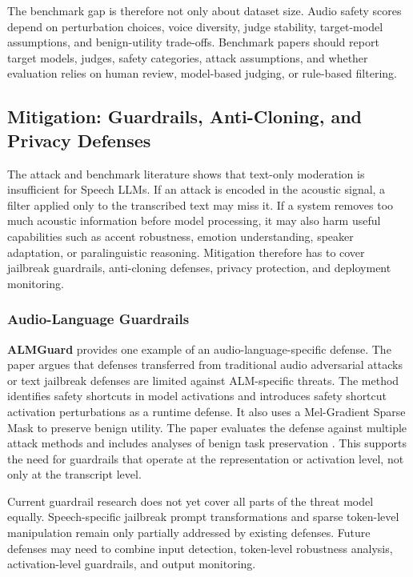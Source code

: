 The benchmark gap is therefore not only about dataset size. Audio safety scores depend on perturbation choices, voice diversity, judge stability, target-model assumptions, and benign-utility trade-offs. Benchmark papers should report target models, judges, safety categories, attack assumptions, and whether evaluation relies on human review, model-based judging, or rule-based filtering.

\subsection{Mitigation: Guardrails, Anti-Cloning, and Privacy Defenses}

The attack and benchmark literature shows that text-only moderation is insufficient for Speech LLMs. If an attack is encoded in the acoustic signal, a filter applied only to the transcribed text may miss it. If a system removes too much acoustic information before model processing, it may also harm useful capabilities such as accent robustness, emotion understanding, speaker adaptation, or paralinguistic reasoning. Mitigation therefore has to cover jailbreak guardrails, anti-cloning defenses, privacy protection, and deployment monitoring.

\subsubsection{Audio-Language Guardrails}

\textbf{ALMGuard} provides one example of an audio-language-specific defense. The paper argues that defenses transferred from traditional audio adversarial attacks or text jailbreak defenses are limited against ALM-specific threats. The method identifies safety shortcuts in model activations and introduces safety shortcut activation perturbations as a runtime defense. It also uses a Mel-Gradient Sparse Mask to preserve benign utility. The paper evaluates the defense against multiple attack methods and includes analyses of benign task preservation \citep{jin2025almguardsafetyshortcutsguardrails}. This supports the need for guardrails that operate at the representation or activation level, not only at the transcript level.

Current guardrail research does not yet cover all parts of the threat model equally. Speech-specific jailbreak prompt transformations and sparse token-level manipulation remain only partially addressed by existing defenses. Future defenses may need to combine input detection, token-level robustness analysis, activation-level guardrails, and output monitoring.

